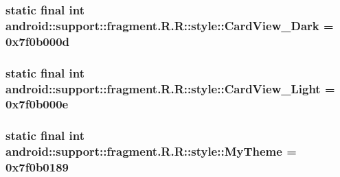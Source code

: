\hypertarget{classandroid_1_1support_1_1fragment_1_1_r_1_1style_1e594b4d38960b572e788b8e9f2e2777}{
\subsubsection[{CardView\_\-Dark}]{\setlength{\rightskip}{0pt plus 5cm}static final int android::support::fragment.R.R::style::CardView\_\-Dark = 0x7f0b000d}}
\label{classandroid_1_1support_1_1fragment_1_1_r_1_1style_1e594b4d38960b572e788b8e9f2e2777}


\hypertarget{classandroid_1_1support_1_1fragment_1_1_r_1_1style_7c8091f058a6c21ee023e2ac70f9c752}{
\subsubsection[{CardView\_\-Light}]{\setlength{\rightskip}{0pt plus 5cm}static final int android::support::fragment.R.R::style::CardView\_\-Light = 0x7f0b000e}}
\label{classandroid_1_1support_1_1fragment_1_1_r_1_1style_7c8091f058a6c21ee023e2ac70f9c752}


\hypertarget{classandroid_1_1support_1_1fragment_1_1_r_1_1style_51e5aa00428f29c94ac3000bf09cbd5b}{
\subsubsection[{MyTheme}]{\setlength{\rightskip}{0pt plus 5cm}static final int android::support::fragment.R.R::style::MyTheme = 0x7f0b0189}}
\label{classandroid_1_1support_1_1fragment_1_1_r_1_1style_51e5aa00428f29c94ac3000bf09cbd5b}


